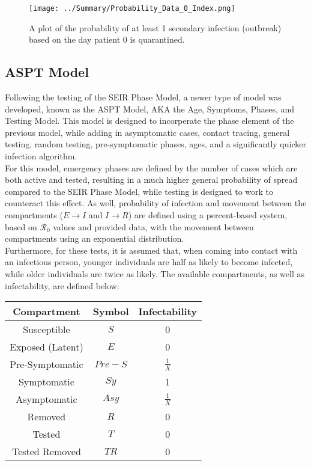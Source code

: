 \documentclass{article}
\numberwithin{equation}{section} %
\begin{document}
\begin{figure}[H]
  \centering
  \texttt{[image: ../Summary/Probability\_Data\_0\_Index.png]}
  \caption{A plot of the probability of at least 1 secondary infection (outbreak) based on the day patient 0 is quarantined.}
\end{figure}

\begin{multicols}{2}
  \subsection{ASPT Model}
  Following the testing of the SEIR Phase Model, a newer type of model was developed, known as the ASPT Model, AKA the Age, Symptoms, Phases, and Testing Model. This model is designed to incorperate the phase element of the previous model, while adding in asymptomatic cases, contact tracing, general testing, random testing, pre-symptomatic phases, ages, and a significantly quicker infection algorithm. \\
  
  For this model, emergency phases are defined by the number of cases which are both active and tested, resulting in a much higher general probability of spread compared to the SEIR Phase Model, while testing is designed to work to counteract this effect. As well, probability of infection and movement between the compartments ($E \rightarrow I$ and $I \rightarrow R$) are defined using a percent-based system, based on $\mathcal{R}_0$ values and provided data, with the movement between compartments using an exponential distribution. \\

  Furthermore, for these tests, it is assumed that, when coming into contact with an infectious person, younger individuals are half as likely to become infected, while older individuals are twice as likely. The available compartments, as well as infectability, are defined below:
  
  \begin{tabular}{|c|c|c|}
    \hline
    Compartment & Symbol &  Infectability \\
    \hline
    Susceptible & $S$ & 0 \\
    Exposed (Latent) & $E$ & 0 \\
    Pre-Symptomatic & $Pre-S$ & $\frac{1}{X}$ \\
    Symptomatic & $Sy$ & 1 \\
    Asymptomatic & $Asy$ & $\frac{1}{X}$ \\
    Removed & $R$ & 0 \\
    Tested & $T$ & 0 \\
    Tested Removed & $TR$ & 0 \\
    \hline
  \end{tabular}


\end{multicols}
\end{document}
